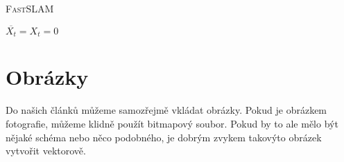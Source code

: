 \documentclass[a4paper, 11pt]{article}
\begin{document}
\begin{algorithm}
	\caption{\textsc{FastSLAM}}
	\label{algorithm:fastslam}

	\SetNlSty{}{}{:}
	\SetInd{1em}{1em}

	\Indm\Indmm
	\Indp\Indpp
	\BlankLine

	$\overline{X_t} = X_t = 0$ \\

\end{algorithm}
\section{Obrázky}
Do našich článků můžeme samozřejmě vkládat obrázky. Pokud je obrázkem fotografie, můžeme klidně použít
bitmapový soubor. Pokud by to ale mělo být nějaké schéma nebo něco podobného, je dobrým zvykem takovýto
obrázek vytvořit vektorově.
\end{document}
